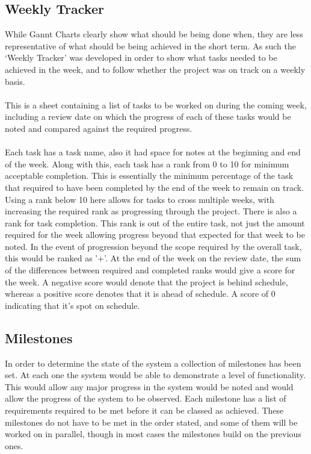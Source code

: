 \subsection{Weekly Tracker}
While Gannt Charts clearly show what should be being done when, they are less representative of what should be being achieved in the short term.
As such the `Weekly Tracker' was developed in order to show what tasks needed to be achieved in the week, and to follow whether the project was on track on a weekly basis.
\\
\\
This is a sheet containing a list of tasks to be worked on during the coming week, including a review date on which the progress of each of these tasks would be noted and compared against the required progress.
\\
\\
Each task has a task name, also it had space for notes at the beginning and end of the week.
Along with this, each task has a rank from 0 to 10 for minimum acceptable completion.
This is essentially the minimum percentage of the task that required to have been completed by the end of the week to remain on track.
Using a rank below 10 here allows for tasks to cross multiple weeks, with increasing the required rank as progressing through the project.
There is also a rank for task completion.
This rank is out of the entire task, not just the amount required for the week allowing progress beyond that expected for that week to be noted.
In the event of progression beyond the scope required by the overall task, this would be ranked as '+'.
At the end of the week on the review date, the sum of the differences between required and completed ranks would give a score for the week.
A negative score would denote that the project is behind schedule, whereas a positive score denotes that it is ahead of schedule.
A score of 0 indicating that it's spot on schedule.

\subsection{Milestones}
In order to determine the state of the system a collection of milestones has been set.
At each one the system would be able to demonstrate a level of functionality.
This would allow any major progress in the system would be noted and would allow the progress of the system to be observed.
Each milestone has a list of requirements required to be met before it can be classed as achieved.
These milestones do not have to be met in the order stated, and some of them will be worked on in parallel, though in most cases the milestones build on the previous ones.

